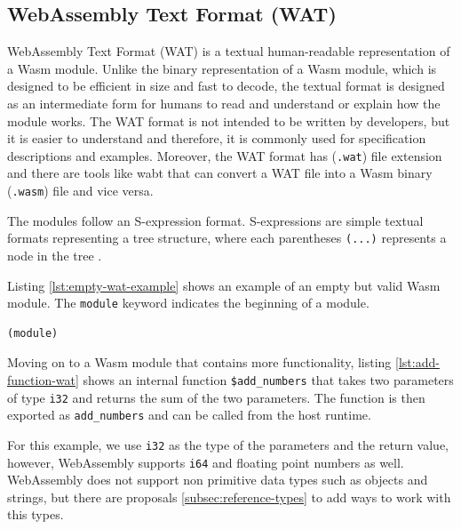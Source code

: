 \subsection{WebAssembly Text Format (WAT)}
\label{subsec:wasm-text-format}

WebAssembly Text Format (WAT) \cite{webassemblycommunitygroup_2023_webassembly} is a textual human-readable representation of a Wasm module. Unlike the binary representation of a Wasm module, which is designed to be efficient in size and fast to decode, the textual format is designed as an intermediate form for humans to read and understand or explain how the module works. The WAT format is not intended to be written by developers, but it is easier to understand and therefore, it is commonly used for specification descriptions and examples. Moreover, the WAT format has (\texttt{.wat}) file extension and there are tools like wabt\cite{webassembly_2020_webassemblywabt} that can convert a WAT file into a Wasm binary (\texttt{.wasm}) file and vice versa.

The modules follow an S-expression format. S-expressions are simple textual formats representing a tree structure, where each parentheses \texttt{(...)} represents a node in the tree \cite{mozillacorporation_2023_understanding}. 

Listing \ref{lst:empty-wat-example} shows an example of an empty but valid Wasm module. The \texttt{module} keyword indicates the beginning of a module.
%
\begin{lstlisting}[frame=lines, style=Wasm, caption={A WAT file containing an empty module}, showstringspaces=false, captionpos=b, label={lst:empty-wat-example}]
(module)
\end{lstlisting}
%
Moving on to a Wasm module that contains more functionality, listing \ref{lst:add-function-wat} shows an internal function \texttt{\$add\_numbers} that takes two parameters of type \texttt{i32} and returns the sum of the two parameters. The function is then exported as \texttt{add\_numbers} and can be called from the host runtime. 

For this example, we use \texttt{i32} as the type of the parameters and the return value, however, WebAssembly supports \texttt{i64} and floating point numbers as well. WebAssembly does not support non primitive data types such as objects and strings, but there are proposals \ref{subsec:reference-types} to add ways to work with this types.

